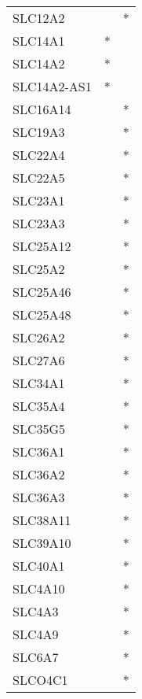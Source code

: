 \begin{longtable}{lcc}
SLC12A2         &                &          * \\
SLC14A1         &              * &            \\
SLC14A2         &              * &            \\
SLC14A2-AS1     &              * &            \\
SLC16A14        &                &          * \\
SLC19A3         &                &          * \\
SLC22A4         &                &          * \\
SLC22A5         &                &          * \\
SLC23A1         &                &          * \\
SLC23A3         &                &          * \\
SLC25A12        &                &          * \\
SLC25A2         &                &          * \\
SLC25A46        &                &          * \\
SLC25A48        &                &          * \\
SLC26A2         &                &          * \\
SLC27A6         &                &          * \\
SLC34A1         &                &          * \\
SLC35A4         &                &          * \\
SLC35G5         &                &          * \\
SLC36A1         &                &          * \\
SLC36A2         &                &          * \\
SLC36A3         &                &          * \\
SLC38A11        &                &          * \\
SLC39A10        &                &          * \\
SLC40A1         &                &          * \\
SLC4A10         &                &          * \\
SLC4A3          &                &          * \\
SLC4A9          &                &          * \\
SLC6A7          &                &          * \\
SLCO4C1         &                &          * \\

\end{longtable}
